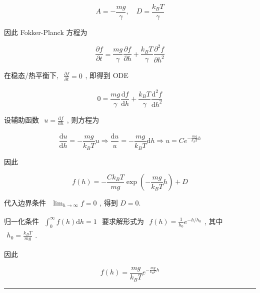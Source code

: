 \documentclass[../../main.tex]{subfiles}
\begin{document}
\begin{enumerate}
$$
A = -\frac{mg}{\gamma},\quad D = \frac{k_{B}T}{\gamma}
$$

因此 Fokker-Planck 方程为

$$
\frac{\partial f}{\partial t} = \frac{mg}{\gamma} \frac{\partial f}{\partial h} + \frac{k_{B}T}{\gamma}\frac{\partial^{2}f}{\partial h^{2}}
$$

在稳态/热平衡下, $\begin{aligned}\frac{\partial f}{\partial t} = 0\end{aligned}$, 即得到 ODE

$$
0 = \frac{mg}{\gamma} \frac{\mathrm{d}f}{\mathrm{d}h} + \frac{k_{B}T}{\gamma}\frac{\mathrm{d}^{2}f}{\mathrm{d}h^{2}}
$$

设辅助函数 $\begin{aligned}u = \frac{\mathrm{d}f}{\mathrm{d}h}\end{aligned}$, 则方程为

$$
\frac{\mathrm{d}u}{\mathrm{d}h} = -\frac{mg}{k_{B}T}u
\Rightarrow \frac{\mathrm{d}u}{u} = -\frac{mg}{k_{B}T}\mathrm{d}h
\Rightarrow u = Ce^{-\frac{mg}{k_{B}T}h}
$$

因此

$$
f(h) = -\frac{Ck_{B}T}{mg}\exp{\left(-\frac{mg}{k_{B}T}h\right)} + D
$$

代入边界条件 $\begin{aligned}\lim_{h\to\infty}f = 0\end{aligned}$, 得到 $D = 0$. 

归一化条件 $\begin{aligned}\int_{0}^{\infty}f(h)\mathrm{d}h = 1\end{aligned}$ 要求解形式为 $\begin{aligned}f(h) = \frac{1}{h_{0}}e^{-h/h_{0}}\end{aligned}$, 其中 $\begin{aligned}h_{0} = \frac{k_{B}T}{mg}\end{aligned}$.

因此

$$
\boxed{f(h) = \frac{mg}{k_{B}T}e^{-\frac{mg}{k_{B}T}h}}
$$

\begin{center}
\rule{0.8\textwidth}{0.4pt}
\end{center}

{}
\end{enumerate}
\end{document}
